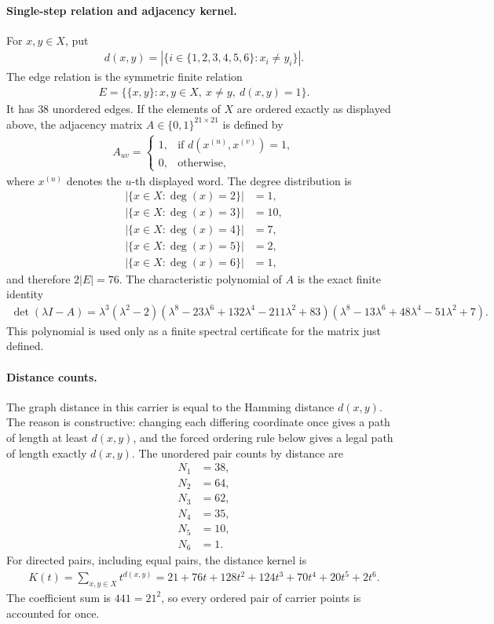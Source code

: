 \paragraph{Single-step relation and adjacency kernel.}
For $x,y\in X$, put
$$
\begin{aligned}
d(x,y)=|\{i\in\{1,2,3,4,5,6\}:x_i\ne y_i\}|.
\end{aligned}
$$
The edge relation is the symmetric finite relation
$$
\begin{aligned}
E=\{\{x,y\}:x,y\in X,\ x\ne y,\ d(x,y)=1\}.
\end{aligned}
$$
It has $38$ unordered edges. If the elements of $X$ are ordered exactly as displayed above, the adjacency matrix $A\in\{0,1\}^{21\times 21}$ is defined by
$$
\begin{aligned}
A_{uv}=\begin{cases}
1,&\text{if }d(x^{(u)},x^{(v)})=1,\\
0,&\text{otherwise,}
\end{cases}
\end{aligned}
$$
where $x^{(u)}$ denotes the $u$-th displayed word. The degree distribution is
$$
\begin{aligned}
|\{x\in X:\deg(x)=2\}|&=1,\\
|\{x\in X:\deg(x)=3\}|&=10,\\
|\{x\in X:\deg(x)=4\}|&=7,\\
|\{x\in X:\deg(x)=5\}|&=2,\\
|\{x\in X:\deg(x)=6\}|&=1,
\end{aligned}
$$
and therefore $2|E|=76$. The characteristic polynomial of $A$ is the exact finite identity
$$
\begin{aligned}
\det(\lambda I-A)=\lambda^3(\lambda^2-2)
(\lambda^8-23\lambda^6+132\lambda^4-211\lambda^2+83)
(\lambda^8-13\lambda^6+48\lambda^4-51\lambda^2+7).
\end{aligned}
$$
This polynomial is used only as a finite spectral certificate for the matrix just defined.

\paragraph{Distance counts.}
The graph distance in this carrier is equal to the Hamming distance $d(x,y)$. The reason is constructive: changing each differing coordinate once gives a path of length at least $d(x,y)$, and the forced ordering rule below gives a legal path of length exactly $d(x,y)$. The unordered pair counts by distance are
$$
\begin{aligned}
N_1&=38,\\
N_2&=64,\\
N_3&=62,\\
N_4&=35,\\
N_5&=10,\\
N_6&=1.
\end{aligned}
$$
For directed pairs, including equal pairs, the distance kernel is
$$
\begin{aligned}
K(t)=\sum_{x,y\in X}t^{d(x,y)}=21+76t+128t^2+124t^3+70t^4+20t^5+2t^6.
\end{aligned}
$$
The coefficient sum is $441=21^2$, so every ordered pair of carrier points is accounted for once.

